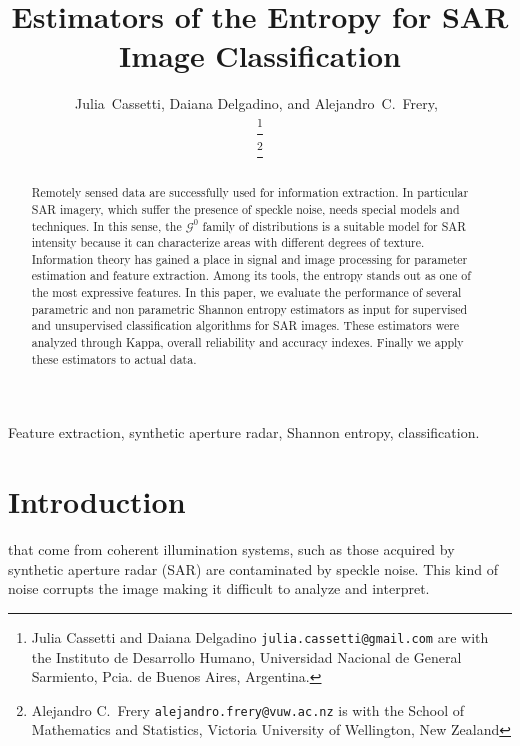 \documentclass[journal]{IEEEtran}
\begin{document}
	
	\title{Estimators of the Entropy for SAR Image Classification}
	\author{ Julia~Cassetti, Daiana Delgadino, and Alejandro~C.~Frery,~
		
		
		\thanks{Julia Cassetti and Daiana Delgadino \texttt{julia.cassetti@gmail.com} are with the  Instituto de Desarrollo Humano, Universidad Nacional de General Sarmiento, Pcia. de Buenos Aires, Argentina.}
		
		\thanks{Alejandro C.\ Frery \texttt{alejandro.frery@vuw.ac.nz} is with the School of Mathematics and Statistics, Victoria University of Wellington, New Zealand} 
	}
	
	\maketitle
	
	\begin{abstract}
		
		Remotely sensed data are successfully used for information extraction. 
		In particular SAR imagery, which suffer the presence of speckle noise, needs special models and techniques. 
		In this sense, the $\mathcal G^0$ family of distributions is a suitable model for SAR intensity because it can characterize areas with different degrees of texture. 
		Information theory has gained a place in signal and image processing for parameter estimation and feature extraction.
		Among its tools, the entropy stands out as one of the most expressive features.
		In this paper, we evaluate the performance of several parametric and non parametric Shannon entropy estimators as input for supervised and unsupervised classification algorithms for SAR images.
		These estimators were analyzed through Kappa, overall reliability and accuracy indexes. 
		Finally we apply these estimators to actual data.
		
	\end{abstract}
	
	\begin{keywords}
		Feature extraction, synthetic aperture radar, Shannon entropy, classification.
	\end{keywords}
	
	\IEEEpeerreviewmaketitle
	
	\section{Introduction}
	\label{intro}
	 that come from coherent illumination systems, such as those acquired by synthetic aperture radar (SAR) are contaminated by speckle noise. 
	This kind of noise corrupts the image making it difficult to analyze and interpret. 
	
\end{document}

